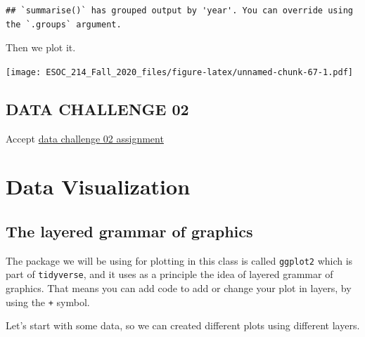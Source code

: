 \documentclass[
]{book}
\newenvironment{Shaded}{\begin{snugshade}}{\end{snugshade}}
\newcommand{\DataTypeTok}[1]{\textcolor[rgb]{0.13,0.29,0.53}{#1}}
\newcommand{\KeywordTok}[1]{\textcolor[rgb]{0.13,0.29,0.53}{\textbf{#1}}}
\newcommand{\NormalTok}[1]{#1}
\newcommand{\OperatorTok}[1]{\textcolor[rgb]{0.81,0.36,0.00}{\textbf{#1}}}
\newcommand{\StringTok}[1]{\textcolor[rgb]{0.31,0.60,0.02}{#1}}
\begin{document}
\begin{verbatim}
## `summarise()` has grouped output by 'year'. You can override using the `.groups` argument.
\end{verbatim}

Then we plot it.

\begin{Shaded}
\end{Shaded}

\texttt{[image: ESOC\_214\_Fall\_2020\_files/figure-latex/unnamed-chunk-67-1.pdf]}

\hypertarget{data-challenge-02}{%
\section{DATA CHALLENGE 02}\label{data-challenge-02}}

Accept \href{https://classroom.github.com/a/h4Hgow-M}{data challenge 02 assignment}

\hypertarget{data-visualization}{%
\chapter{Data Visualization}\label{data-visualization}}

\hypertarget{the-layered-grammar-of-graphics}{%
\section{The layered grammar of graphics}\label{the-layered-grammar-of-graphics}}

The package we will be using for plotting in this class is called \texttt{ggplot2} which is part of \texttt{tidyverse}, and it uses as a principle the idea of layered grammar of graphics. That means you can add code to add or change your plot in layers, by using the \texttt{+} symbol.

Let's start with some data, so we can created different plots using different layers.
\end{document}
